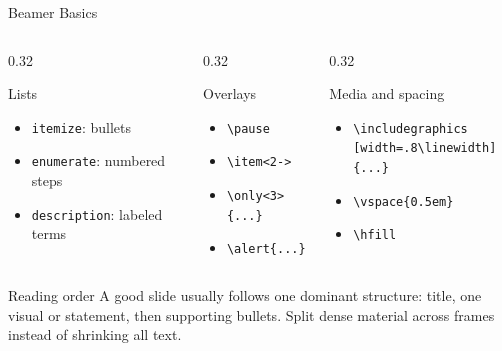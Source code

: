 \documentclass[aspectratio=169,10pt]{beamer}
\begin{document}
\begin{academicframe}{Beamer Basics}
  \begin{columns}[T,onlytextwidth]
    \begin{column}{0.32\textwidth}
      \begin{block}{Lists}
        \scriptsize
        \begin{itemize}
          \item \texttt{itemize}: bullets
          \item \texttt{enumerate}: numbered steps
          \item \texttt{description}: labeled terms
        \end{itemize}
      \end{block}
    \end{column}
    \begin{column}{0.32\textwidth}
      \begin{exampleblock}{Overlays}
        \scriptsize
        \begin{itemize}
          \item \texttt{\textbackslash pause}
          \item \texttt{\textbackslash item<2->}
          \item \texttt{\textbackslash only<3>\{...\}}
          \item \texttt{\textbackslash alert\{...\}}
        \end{itemize}
      \end{exampleblock}
    \end{column}
    \begin{column}{0.32\textwidth}
      \begin{alertblock}{Media and spacing}
        \scriptsize
        \begin{itemize}
          \item \texttt{\textbackslash includegraphics}\\
            \texttt{[width=.8\textbackslash linewidth]\{...\}}
          \item \texttt{\textbackslash vspace\{0.5em\}}
          \item \texttt{\textbackslash hfill}
        \end{itemize}
      \end{alertblock}
    \end{column}
  \end{columns}

  \vspace{0.45em}
  \begin{exampleblock}{Reading order}
    \scriptsize
    A good slide usually follows one dominant structure: title, one visual or
    statement, then supporting bullets. Split dense material across frames
    instead of shrinking all text.
  \end{exampleblock}
\end{academicframe}
\end{document}

